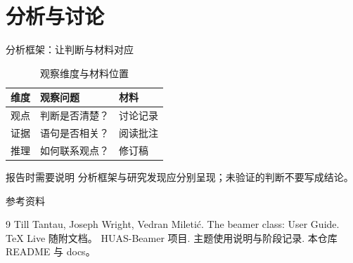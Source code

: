 \documentclass[aspectratio=169]{ctexbeamer}
\begin{document}
\section{分析与讨论}
\begin{frame}{分析框架：让判断与材料对应}
  \begin{table}
    \caption{观察维度与材料位置}
    \renewcommand{\arraystretch}{1.5}
    \begin{tabular}{lll}
      \hline
      \textbf{维度} & \textbf{观察问题} & \textbf{材料} \\
      \hline
      观点 & 判断是否清楚？ & 讨论记录 \\
      证据 & 语句是否相关？ & 阅读批注 \\
      推理 & 如何联系观点？ & 修订稿 \\
      \hline
    \end{tabular}
  \end{table}
  \begin{alertblock}{报告时需要说明}
    分析框架与研究发现应分别呈现；未验证的判断不要写成结论。
  \end{alertblock}
\end{frame}
\begin{frame}{参考资料}
  \begin{thebibliography}{9}
    Till Tantau, Joseph Wright, Vedran Miletić.
      \newblock The beamer class: User Guide.
      \newblock TeX Live 随附文档。
    HUAS-Beamer 项目.
      \newblock 主题使用说明与阶段记录.
      \newblock 本仓库 README 与 docs。
  \end{thebibliography}
\end{frame}
\HUASclosingframe
\end{document}
